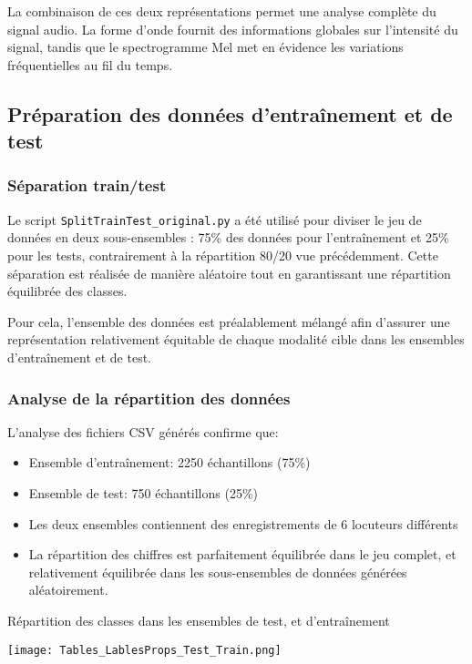 \documentclass{article}
\begin{document}
La combinaison de ces deux représentations permet une analyse complète du signal audio. La forme d’onde fournit des informations globales sur l’intensité du signal, tandis que le spectrogramme Mel met en évidence les variations fréquentielles au fil du temps.

\subsection{Préparation des données d'entraînement et de test}
\label{sec:preparation}

\subsubsection{Séparation train/test}
\label{subsec:split}

Le script \texttt{SplitTrainTest\_original.py} a été utilisé pour diviser le jeu de données en deux sous-ensembles : 75\% des données pour l'entraînement et 25\% pour les tests, contrairement à la répartition 80/20 vue précédemment. Cette séparation est réalisée de manière aléatoire tout en garantissant une répartition équilibrée des classes. 

Pour cela, l'ensemble des données est préalablement mélangé afin d'assurer une représentation relativement équitable de chaque modalité cible dans les ensembles d'entraînement et de test.

\subsubsection{Analyse de la répartition des données}
\label{subsec:analyse_repartition}

L'analyse des fichiers CSV générés confirme que:
\begin{itemize}
    \item Ensemble d'entraînement: 2250 échantillons (75\%)
    \item Ensemble de test: 750 échantillons (25\%)
    \item Les deux ensembles contiennent des enregistrements de 6 locuteurs différents
    \item La répartition des chiffres est parfaitement équilibrée dans le jeu complet, et relativement équilibrée dans les sous-ensembles de données générées aléatoirement. 
\end{itemize}

\begin{table}[H]
    \centering
    \caption{Répartition des classes dans les ensembles de test, et d'entraînement}
    \label{tab:repartition}
    \texttt{[image: Tables\_LablesProps\_Test\_Train.png]}
\end{table}
\end{document}
